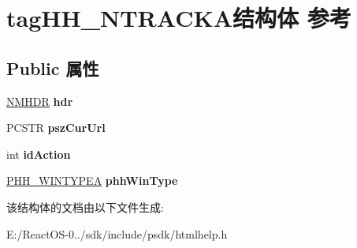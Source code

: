 \hypertarget{structtag_h_h___n_t_r_a_c_k_a}{}\section{tag\+H\+H\+\_\+\+N\+T\+R\+A\+C\+K\+A结构体 参考}
\label{structtag_h_h___n_t_r_a_c_k_a}
\subsection*{Public 属性}
\begin{DoxyCompactItemize}
\item 
\mbox{\label{structtag_h_h___n_t_r_a_c_k_a_ab7fba5bbb643f02d81a019fbacb25cf4}} 
\hyperlink{structtag_n_m_h_d_r}{N\+M\+H\+DR} {\bfseries hdr}
\item 
\mbox{\label{structtag_h_h___n_t_r_a_c_k_a_aadc94afa8aa1af7e9ca5b4e6c8ddda46}} 
P\+C\+S\+TR {\bfseries psz\+Cur\+Url}
\item 
\mbox{\label{structtag_h_h___n_t_r_a_c_k_a_abc876dc76c894a928a079a038e5c43d2}} 
int {\bfseries id\+Action}
\item 
\mbox{\label{structtag_h_h___n_t_r_a_c_k_a_aabb7b4c2bd5515e88e14e60c65dcc754}} 
\hyperlink{structtag_h_h___w_i_n_t_y_p_e_a}{P\+H\+H\+\_\+\+W\+I\+N\+T\+Y\+P\+EA} {\bfseries phh\+Win\+Type}
\end{DoxyCompactItemize}


该结构体的文档由以下文件生成\+:\begin{DoxyCompactItemize}
\item 
E\+:/\+React\+O\+S-\/0../sdk/include/psdk/htmlhelp.\+h\end{DoxyCompactItemize}
